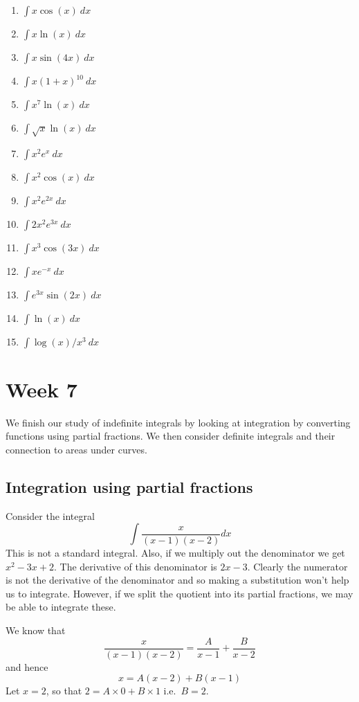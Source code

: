 \documentclass[
  11pt,
  oneside]{book}
\providecommand{\tightlist}{%
  \setlength{\itemsep}{0pt}\setlength{\parskip}{0pt}}
\newcommand{\slide}{}
\theoremstyle{definition}
\theoremstyle{definition}
\theoremstyle{definition}
\theoremstyle{definition}
\theoremstyle{remark}
\begin{document}
\begin{enumerate}
\def\labelenumi{\arabic{enumi}.}
\tightlist
\item
  \(\int x\cos(x)\ dx\)
\item
  \(\int x\ln(x)\ dx\)
\item
  \(\int x\sin(4x)\ dx\)
\item
  \(\int x(1+x)^{10}\ dx\)
\item
  \(\int x^7\ln(x)\ dx\)
\item
  \(\int \sqrt{x}\ln(x)\ dx\)
\item
  \(\int x^2e^x\ dx\)
\item
  \(\int x^2\cos(x)\ dx\)
\item
  \(\int x^2e^{2x}\ dx\)
\item
  \(\int 2x^2e^{3x}\ dx\)
\item
  \(\int x^3\cos(3x)\ dx\)
\item
  \(\int xe^{-x}\ dx\)
\item
  \(\int e^{3x}\sin(2x)\ dx\)
\item
  \(\int \ln(x)\ dx\)
\item
  \(\int \log(x)/x^3\ dx\)
\end{enumerate}

\chapter{Week 7}\label{week-seven}

We finish our study of indefinite integrals by looking at integration by converting functions using partial fractions. We then consider definite integrals and their connection to areas under curves.
\slide

\section{Integration using partial fractions}\label{integration-using-partial-fractions}

Consider the integral
\[
\int\frac{x}{(x-1)(x-2)}dx
\]
This is not a standard integral. Also, if we multiply out the denominator we get \(x^2 - 3x + 2\). The derivative of this denominator is \(2x - 3\). Clearly the numerator is not the derivative of the denominator and so making a substitution won't help us to integrate. However, if we split the quotient into its partial fractions, we may be able to integrate these.

We know that
\[
\frac{x}{(x-1)(x-2)} = \frac A{x-1}+\frac B{x-2}
\]
and hence
\[
x = A(x-2)+B(x-1)
\]
Let \(x=2\), so that \(2=A\times0+B\times1\) i.e.~\(B=2\).
\end{document}
